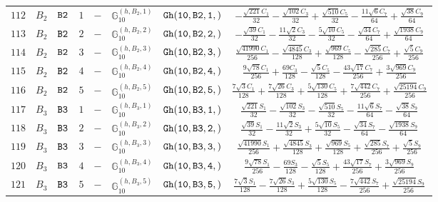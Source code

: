 \documentclass[fleqn,8pt]{jsarticle}
\begin{document}
\begin{table}[ht!]
\begin{center}
\begin{tabular}{cccccccc}
$ 112 $ & $ B_{2} $ & $ {\tt B2} $ & $ 1 $ & $ - $ & $ \mathbb{G}_{10}^{(h,B_{2},1)} $ & $ {\tt Gh(10,B2,1,)} $ & $ - \frac{\sqrt{221} C_{1}}{32} - \frac{\sqrt{102} C_{3}}{32} + \frac{\sqrt{510} C_{5}}{32} - \frac{11 \sqrt{6} C_{7}}{64} + \frac{\sqrt{38} C_{9}}{64} $ \\
$ 113 $ & $ B_{2} $ & $ {\tt B2} $ & $ 2 $ & $ - $ & $ \mathbb{G}_{10}^{(h,B_{2},2)} $ & $ {\tt Gh(10,B2,2,)} $ & $ - \frac{\sqrt{39} C_{1}}{32} - \frac{11 \sqrt{2} C_{3}}{32} - \frac{5 \sqrt{10} C_{5}}{32} - \frac{\sqrt{34} C_{7}}{64} + \frac{\sqrt{1938} C_{9}}{64} $ \\
$ 114 $ & $ B_{2} $ & $ {\tt B2} $ & $ 3 $ & $ - $ & $ \mathbb{G}_{10}^{(h,B_{2},3)} $ & $ {\tt Gh(10,B2,3,)} $ & $ \frac{\sqrt{41990} C_{1}}{256} - \frac{\sqrt{4845} C_{3}}{128} + \frac{\sqrt{969} C_{5}}{128} - \frac{\sqrt{285} C_{7}}{256} + \frac{\sqrt{5} C_{9}}{256} $ \\
$ 115 $ & $ B_{2} $ & $ {\tt B2} $ & $ 4 $ & $ - $ & $ \mathbb{G}_{10}^{(h,B_{2},4)} $ & $ {\tt Gh(10,B2,4,)} $ & $ \frac{9 \sqrt{78} C_{1}}{256} + \frac{69 C_{3}}{128} - \frac{\sqrt{5} C_{5}}{128} - \frac{43 \sqrt{17} C_{7}}{256} + \frac{3 \sqrt{969} C_{9}}{256} $ \\
$ 116 $ & $ B_{2} $ & $ {\tt B2} $ & $ 5 $ & $ - $ & $ \mathbb{G}_{10}^{(h,B_{2},5)} $ & $ {\tt Gh(10,B2,5,)} $ & $ \frac{7 \sqrt{3} C_{1}}{128} + \frac{7 \sqrt{26} C_{3}}{128} + \frac{5 \sqrt{130} C_{5}}{128} + \frac{7 \sqrt{442} C_{7}}{256} + \frac{\sqrt{25194} C_{9}}{256} $ \\
$ 117 $ & $ B_{3} $ & $ {\tt B3} $ & $ 1 $ & $ - $ & $ \mathbb{G}_{10}^{(h,B_{3},1)} $ & $ {\tt Gh(10,B3,1,)} $ & $ \frac{\sqrt{221} S_{1}}{32} - \frac{\sqrt{102} S_{3}}{32} - \frac{\sqrt{510} S_{5}}{32} - \frac{11 \sqrt{6} S_{7}}{64} - \frac{\sqrt{38} S_{9}}{64} $ \\
$ 118 $ & $ B_{3} $ & $ {\tt B3} $ & $ 2 $ & $ - $ & $ \mathbb{G}_{10}^{(h,B_{3},2)} $ & $ {\tt Gh(10,B3,2,)} $ & $ \frac{\sqrt{39} S_{1}}{32} - \frac{11 \sqrt{2} S_{3}}{32} + \frac{5 \sqrt{10} S_{5}}{32} - \frac{\sqrt{34} S_{7}}{64} - \frac{\sqrt{1938} S_{9}}{64} $ \\
$ 119 $ & $ B_{3} $ & $ {\tt B3} $ & $ 3 $ & $ - $ & $ \mathbb{G}_{10}^{(h,B_{3},3)} $ & $ {\tt Gh(10,B3,3,)} $ & $ \frac{\sqrt{41990} S_{1}}{256} + \frac{\sqrt{4845} S_{3}}{128} + \frac{\sqrt{969} S_{5}}{128} + \frac{\sqrt{285} S_{7}}{256} + \frac{\sqrt{5} S_{9}}{256} $ \\
$ 120 $ & $ B_{3} $ & $ {\tt B3} $ & $ 4 $ & $ - $ & $ \mathbb{G}_{10}^{(h,B_{3},4)} $ & $ {\tt Gh(10,B3,4,)} $ & $ \frac{9 \sqrt{78} S_{1}}{256} - \frac{69 S_{3}}{128} - \frac{\sqrt{5} S_{5}}{128} + \frac{43 \sqrt{17} S_{7}}{256} + \frac{3 \sqrt{969} S_{9}}{256} $ \\
$ 121 $ & $ B_{3} $ & $ {\tt B3} $ & $ 5 $ & $ - $ & $ \mathbb{G}_{10}^{(h,B_{3},5)} $ & $ {\tt Gh(10,B3,5,)} $ & $ \frac{7 \sqrt{3} S_{1}}{128} - \frac{7 \sqrt{26} S_{3}}{128} + \frac{5 \sqrt{130} S_{5}}{128} - \frac{7 \sqrt{442} S_{7}}{256} + \frac{\sqrt{25194} S_{9}}{256} $ \\
 \hline \hline
\end{tabular}
\end{center}
\end{table}
\end{document}
